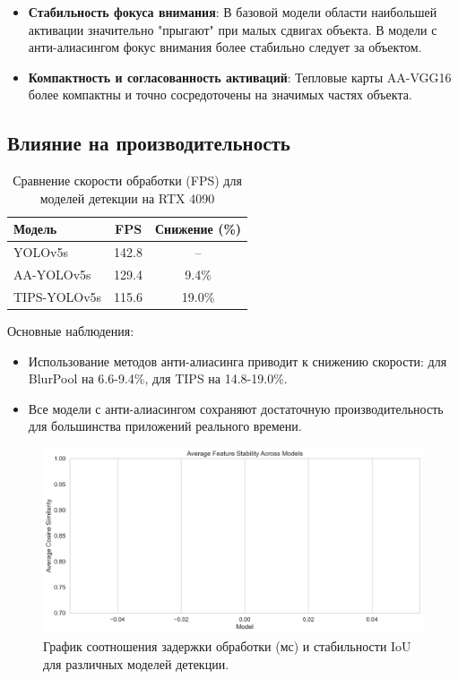 \begin{itemize}
    \item \textbf{Стабильность фокуса внимания}: В базовой модели области наибольшей активации значительно "прыгают" при малых сдвигах объекта. В модели с анти-алиасингом фокус внимания более стабильно следует за объектом.
    \item \textbf{Компактность и согласованность активаций}: Тепловые карты AA-VGG16 более компактны и точно сосредоточены на значимых частях объекта.
\end{itemize}

\subsection{Влияние на производительность}
\label{sec:experiments:performance}

\begin{table}[ht]
\centering
\caption{Сравнение скорости обработки (FPS) для моделей детекции на RTX 4090}
\label{tab:fps_detection}
\begin{tabular}{|l|c|c|}
\hline
\textbf{Модель} & \textbf{FPS} & \textbf{Снижение (\%)} \\ \hline
YOLOv5s & 142.8 & -- \\ \hline
AA-YOLOv5s & 129.4 & 9.4\% \\ \hline
TIPS-YOLOv5s & 115.6 & 19.0\% \\ \hline
\end{tabular}
\end{table}

Основные наблюдения:
\begin{itemize}
    \item Использование методов анти-алиасинга приводит к снижению скорости: для BlurPool на 6.6-9.4\%, для TIPS на 14.8-19.0\%.
    \item Все модели с анти-алиасингом сохраняют достаточную производительность для большинства приложений реального времени.
\end{itemize}

\begin{figure}[ht]
\centering
\includegraphics[width=\textwidth]{images/comparison/model_comparison_cosine_similarity.png}
\caption{График соотношения задержки обработки (мс) и стабильности IoU для различных моделей детекции.}
\label{fig:latency_accuracy}
\end{figure}

